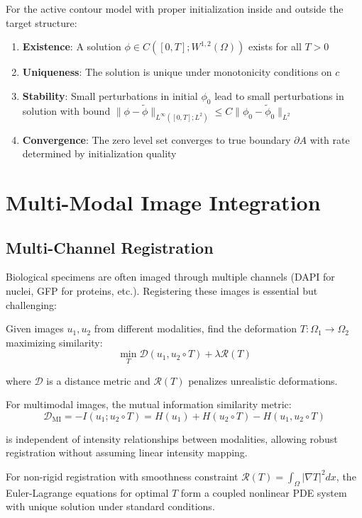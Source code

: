 \documentclass[twocolumn,11pt]{article}
\begin{document}
\begin{theorem}
For the active contour model with proper initialization inside and outside the target structure:
\begin{enumerate}
\item \textbf{Existence}: A solution $\phi \in C([0,T]; W^{1,2}(\Omega))$ exists for all $T > 0$
\item \textbf{Uniqueness}: The solution is unique under monotonicity conditions on $c$
\item \textbf{Stability}: Small perturbations in initial $\phi_0$ lead to small perturbations in solution with bound $\|\phi - \tilde{\phi}\|_{L^\infty([0,T]; L^2)} \leq C \|\phi_0 - \tilde{\phi}_0\|_{L^2}$
\item \textbf{Convergence}: The zero level set converges to true boundary $\partial A$ with rate determined by initialization quality
\end{enumerate}
\end{theorem}

\section{Multi-Modal Image Integration}

\subsection{Multi-Channel Registration}

Biological specimens are often imaged through multiple channels (DAPI for nuclei, GFP for proteins, etc.). Registering these images is essential but challenging:

\begin{definition}
Given images $u_1, u_2$ from different modalities, find the deformation $T: \Omega_1 \to \Omega_2$ maximizing similarity:
\begin{equation}
\min_{T} \mathcal{D}(u_1, u_2 \circ T) + \lambda \mathcal{R}(T)
\end{equation}

where $\mathcal{D}$ is a distance metric and $\mathcal{R}(T)$ penalizes unrealistic deformations.
\end{definition}

\begin{theorem}
For multimodal images, the mutual information similarity metric:
\begin{equation}
\mathcal{D}_{\text{MI}} = -I(u_1; u_2 \circ T) = H(u_1) + H(u_2 \circ T) - H(u_1, u_2 \circ T)
\end{equation}

is independent of intensity relationships between modalities, allowing robust registration without assuming linear intensity mapping.

For non-rigid registration with smoothness constraint $\mathcal{R}(T) = \int_\Omega |\nabla T|^2 dx$, the Euler-Lagrange equations for optimal $T$ form a coupled nonlinear PDE system with unique solution under standard conditions.
\end{theorem}
\end{document}

